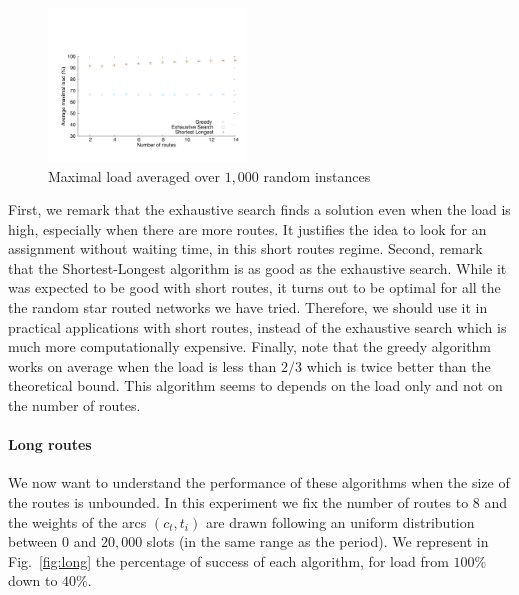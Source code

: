 \documentclass[10pt, conference, letterpaper]{IEEEtran}
\begin{document}
        
      \begin{figure}[h]
      \begin{center}
	 \includegraphics[width=0.47\textwidth]{periode_petite.pdf}
      \end{center}
      \caption{Maximal load averaged over $1,000$ random instances}\label{fig:short}
      \end{figure}
      First, we remark that the exhaustive search finds a solution even when the load is high, especially when there are more routes.
      It justifies the idea to look for an assignment without waiting time, in this short routes regime.
      Second, remark that the Shortest-Longest algorithm is as good as the exhaustive search. While it was expected to be good with short routes, it turns out to be optimal for all the the random star routed networks we have tried. Therefore, we should use it in practical applications with short routes, instead of the exhaustive search which is much more computationally expensive. 
      Finally, note that the greedy algorithm works on average when the load is less than $2/3$ which is twice better than the theoretical bound. This algorithm seems to depends on the load only and not on the number of routes.
      
        \paragraph{Long routes}
      
      We now want to understand the performance of these algorithms when the size of the routes is unbounded. In this experiment we fix the number of routes to $8$ and the weights of the arcs $(c_t,t_i)$ are drawn following an uniform distribution between $0$ and $20,000$ slots (in the same range as the period). We represent in Fig.~\ref{fig:long} the percentage of success of each algorithm, for load from $100\%$ down to $40\%$.
      
\end{document}
